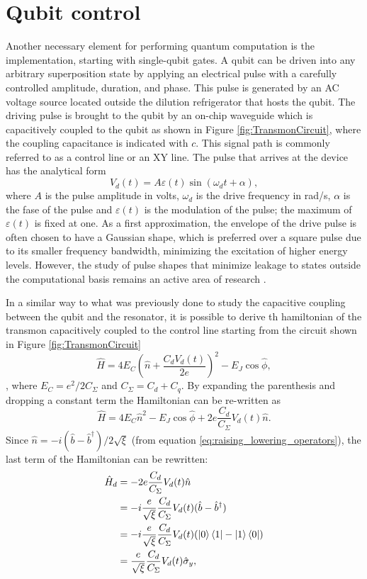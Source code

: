 \section{Qubit control}\label{sec:qubit_control}
Another necessary element for performing quantum computation is the implementation, starting with single-qubit gates. 
A qubit can be driven into any arbitrary superposition state by applying an electrical pulse with a carefully controlled amplitude, duration, and phase.
This pulse is generated by an AC voltage source located outside the dilution refrigerator that hosts the qubit.
The driving pulse is brought to the qubit by an on-chip waveguide which is capacitively coupled to the qubit as shown in Figure \ref{fig:TransmonCircuit}, where the coupling capacitance is indicated with $c$.
This signal path is commonly referred to as a control line or an XY line. The pulse that arrives at the device has the analytical form
\begin{equation}\label{eq:drive_pulse}
    V_d(t) = A\varepsilon(t)\sin{(\omega_d t + \alpha)},
\end{equation}
where $A$ is the pulse amplitude in volts, $\omega_d$ is the drive frequency in rad/s, $\alpha$ is the fase of the pulse and $\varepsilon(t)$ is the modulation of the pulse; the maximum of $\varepsilon(t)$ is fixed at one.
As a first approximation, the envelope of the drive pulse is often chosen to have a Gaussian shape, which is preferred over a square pulse due to its smaller frequency bandwidth, minimizing the excitation of higher energy levels.
However, the study of pulse shapes that minimize leakage to states outside the computational basis remains an active area of research \cite{chiaro2025activeleakagecancellationsingle}.

In a similar way to what was previously done to study the capacitive coupling between the qubit and the resonator, it is possible to derive th hamiltonian of the transmon capacitively coupled to the control line starting from the circuit shown in Figure \ref{fig:TransmonCircuit}
\begin{equation}
    \hat{H} = 4E_C(\hat{n} + \frac{C_d V_d(t)}{2e})^2 - E_J \cos{\hat{\phi}},
\end{equation}, 
where $E_C = e^2/2C_\Sigma$ and $C_\Sigma =  C_d + C_q$. By expanding the parenthesis and dropping a constant term the Hamiltonian can be re-written as
\begin{equation}\label{eq:tmp}
    \hat{H} =  4E_C\hat{n}^2 -E_J\cos{\hat{\phi}} + 2e\frac{C_d}{C_\Sigma}V_d(t)\hat{n}.
\end{equation}
Since $\hat{n} = -i(\hat{b}-\hat{b}^\dagger)/2\sqrt{\xi}$ (from equation \ref{eq:raising_lowering_operators}), the last term of the Hamiltonian can be rewritten:
\begin{align}\label{eq:misto}
    \hat{H}_d &= -2e\frac{C_d}{C_\Sigma}V_d(t)\hat{n}\\
    &=-i\frac{e}{\sqrt{\xi}}\frac{C_d}{C_{\Sigma}}V_d(t)(\hat{b}-\hat{b}^\dagger)\\
    &=-i\frac{e}{\sqrt{\xi}}\frac{C_d}{C_{\Sigma}}V_d(t)(\ket{0}\bra{1}-\ket{1}\bra{0})\\
    &=\frac{e}{\sqrt{\xi}}\frac{C_d}{C_{\Sigma}}V_d(t)\hat{\sigma}_y,
\end{align}


